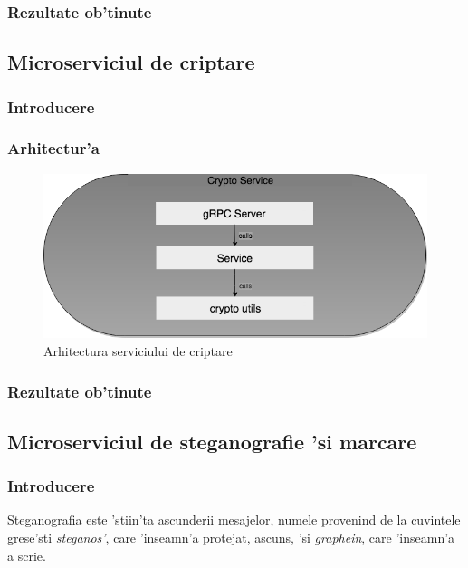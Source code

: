 \documentclass[12pt,a4paper,twoside]{report}
\begin{document}
\subsubsection{Rezultate ob'tinute}


\subsection{Microserviciul de criptare} \label{s_crypto}
\subsubsection{Introducere}
\subsubsection{Arhitectur'a}

\begin{figure}[H]
\begin{center}
\advance\leftskip-3cm
\advance\rightskip-3cm
\includegraphics[keepaspectratio=true,scale=0.4]{img/crypto_arch.png}
\caption{Arhitectura serviciului de criptare}
\label{crypto_arch}
\end{center}
\end{figure}

\subsubsection{Rezultate ob'tinute}


\subsection{Microserviciul de steganografie 'si marcare}  \label{s_watermarking}

\subsubsection{Introducere}
Steganografia este 'stiin'ta ascunderii mesajelor, numele provenind de la cuvintele grese'sti \textit{steganos'}, care 'inseamn'a protejat, ascuns, 'si \textit{graphein}, care 'inseamn'a a scrie.
\end{document}
